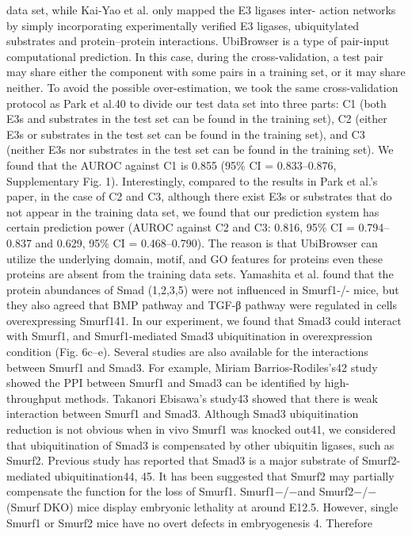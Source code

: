 data set, while Kai-Yao et al. only mapped the E3 ligases inter-
action networks by simply incorporating experimentally veriﬁed
E3
ligases,
ubiquitylated
substrates
and
protein–protein
interactions.
UbiBrowser is a type of pair-input computational prediction.
In this case, during the cross-validation, a test pair may share
either the component with some pairs in a training set, or it may
share neither. To avoid the possible over-estimation, we took the
same cross-validation protocol as Park et al.40 to divide our test
data set into three parts: C1 (both E3s and substrates in the test
set can be found in the training set), C2 (either E3s or substrates
in the test set can be found in the training set), and C3 (neither
E3s nor substrates in the test set can be found in the training set).
We
found
that
the
AUROC
against
C1
is
0.855
(95\%
CI = 0.833–0.876, Supplementary Fig. 1). Interestingly, compared
to the results in Park et al.’s paper, in the case of C2 and C3,
although there exist E3s or substrates that do not appear in the
training data set, we found that our prediction system has certain
prediction power (AUROC against C2 and C3: 0.816, 95\%
CI = 0.794–0.837 and 0.629, 95\% CI = 0.468–0.790). The reason
is that UbiBrowser can utilize the underlying domain, motif, and
GO features for proteins even these proteins are absent from the
training data sets.
Yamashita et al. found that the protein abundances of Smad
(1,2,3,5) were not inﬂuenced in Smurf1-/- mice, but they also
agreed that BMP pathway and TGF-β pathway were regulated in
cells overexpressing Smurf141. In our experiment, we found that
Smad3 could interact with Smurf1, and Smurf1-mediated Smad3
ubiquitination in overexpression condition (Fig. 6c–e). Several
studies are also available for the interactions between Smurf1 and
Smad3. For example, Miriam Barrios-Rodiles’s42 study showed
the PPI between Smurf1 and Smad3 can be identiﬁed by high-
throughput methods. Takanori Ebisawa’s study43 showed that
there is weak interaction between Smurf1 and Smad3. Although
Smad3 ubiquitination reduction is not obvious when in vivo
Smurf1 was knocked out41, we considered that ubiquitination of
Smad3 is compensated by other ubiquitin ligases, such as Smurf2.
Previous study has reported that Smad3 is a major substrate of
Smurf2-mediated ubiquitination44, 45. It has been suggested that
Smurf2 may partially compensate the function for the loss of
Smurf1. Smurf1−/−and Smurf2−/−(Smurf DKO) mice display
embryonic lethality at around E12.5. However, single Smurf1 or
Smurf2 mice have no overt defects in embryogenesis 4. Therefore
